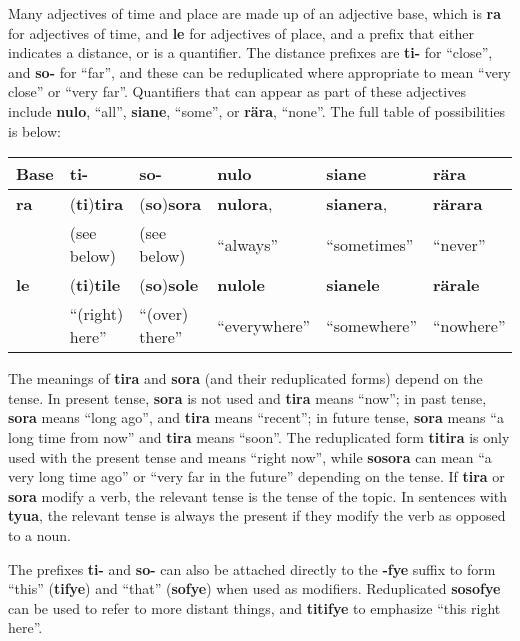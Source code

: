 \documentclass{article}
\begin{document}
Many adjectives of time and place are made up of an adjective base, which is \textbf{ra} for adjectives of time, and \textbf{le} for adjectives of place, and a prefix that either indicates a distance, or is a quantifier.  The distance prefixes are \textbf{ti-} for ``close'', and \textbf{so-} for ``far'', and these can be reduplicated where appropriate to mean ``very close'' or ``very far''.  Quantifiers that can appear as part of these adjectives include \textbf{nulo}, ``all'', \textbf{siane}, ``some'', or \textbf{r\"ara}, ``none''.  The full table of possibilities is below:

\begin{table}[htb!]
\begin{tabular}{|l|l l l l l|}
\hline
Base & \textbf{ti-} & \textbf{so-} & \textbf{nulo} & \textbf{siane} & \textbf{r\"ara} \\
\hline
\textbf{ra} & (\textbf{ti})\textbf{tira} & (\textbf{so})\textbf{sora} & \textbf{nulora}, & \textbf{sianera}, & \textbf{r\"arara} \\
& (see below) & (see below) & ``always'' & ``sometimes'' & ``never'' \\
\hline
\textbf{le} & (\textbf{ti})\textbf{tile}& (\textbf{so})\textbf{sole} & \textbf{nulole} & \textbf{sianele} & \textbf{r\"arale} \\
& ``(right) here'' & ``(over) there'' & ``everywhere'' & ``somewhere'' & ``nowhere'' \\
\hline
\end{tabular}
\end{table}

The meanings of \textbf{tira} and \textbf{sora} (and their reduplicated forms) depend on the tense.  In present tense, \textbf{sora} is not used and \textbf{tira} means ``now''; in past tense, \textbf{sora} means ``long ago'', and \textbf{tira} means ``recent''; in future tense, \textbf{sora} means ``a long time from now'' and \textbf{tira} means ``soon''.  The reduplicated form \textbf{titira} is only used with the present tense and means ``right now'', while \textbf{sosora} can mean ``a very long time ago'' or ``very far in the future'' depending on the tense.  If \textbf{tira} or \textbf{sora} modify a verb, the relevant tense is the tense of the topic.  In sentences with \textbf{tyua}, the relevant tense is always the present if they modify the verb as opposed to a noun.

The prefixes \textbf{ti-} and \textbf{so-} can also be attached directly to the \textbf{-fye} suffix to form ``this'' (\textbf{tifye}) and ``that'' (\textbf{sofye}) when used as modifiers.  Reduplicated \textbf{sosofye} can be used to refer to more distant things, and \textbf{titifye} to emphasize ``this right here''.
\end{document}
